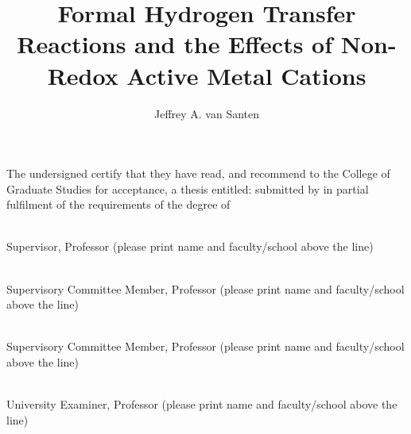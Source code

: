 \documentclass[msc,oneside]{ubcthesis}%
\title{Formal Hydrogen Transfer Reactions and the Effects of Non-Redox
  Active Metal Cations}
\author{Jeffrey A. van Santen} %
\begin{document}
\frontmatter                    %

\maketitle                      %

\makeatletter

The undersigned certify that they have read, and recommend to the
College of Graduate Studies for acceptance, a thesis entitled: {\sc
  \@title } submitted by {\sc \@author} in partial fulfilment of the requirements of the degree of \@degreetitle \makeatother

\newlength{\linespace}
\setlength{\linespace}{.75cm} %
\vspace{\linespace}\smaller

\noindent\underline{\hspace{30em}} \\
Supervisor, Professor (please print name and faculty/school above the line)

\vspace{\linespace}

\noindent\underline{\hspace{30em}} \\
Supervisory Committee Member, Professor (please print name and faculty/school above the line)

\vspace{\linespace}

\noindent\underline{\hspace{30em}} \\
Supervisory Committee Member, Professor (please print name and faculty/school above the line)

\vspace{\linespace}

\noindent\underline{\hspace{30em}} \\
University Examiner, Professor (please print name and faculty/school above the line)
\end{document}
